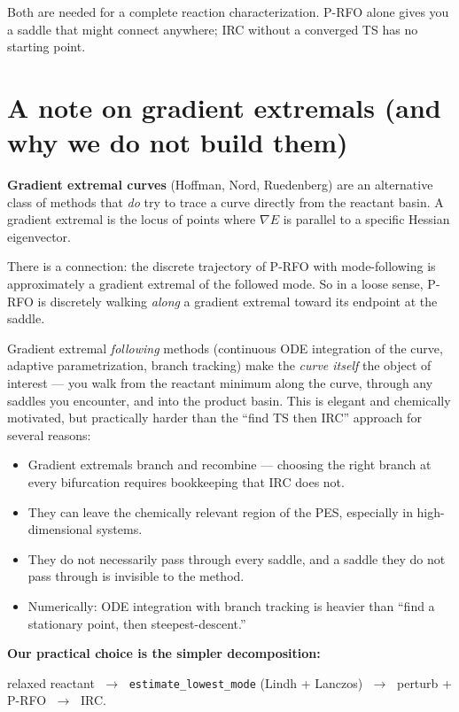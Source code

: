 \documentclass[11pt]{article}
\begin{document}
Both are needed for a complete reaction characterization.  P-RFO alone gives
you a saddle that might connect anywhere; IRC without a converged TS has no
starting point.

\section{A note on gradient extremals (and why we do not build them)}

\textbf{Gradient extremal curves} (Hoffman, Nord, Ruedenberg) are an alternative
class of methods that \emph{do} try to trace a curve directly from the reactant
basin.  A gradient extremal is the locus of points where $\nabla E$ is
parallel to a specific Hessian eigenvector.

There is a connection: the discrete trajectory of P-RFO with mode-following is
approximately a gradient extremal of the followed mode.  So in a loose sense,
P-RFO is discretely walking \emph{along} a gradient extremal toward its
endpoint at the saddle.

Gradient extremal \emph{following} methods (continuous ODE integration of the
curve, adaptive parametrization, branch tracking) make the \emph{curve itself}
the object of interest --- you walk from the reactant minimum along the curve,
through any saddles you encounter, and into the product basin.  This is
elegant and chemically motivated, but practically harder than the ``find TS
then IRC'' approach for several reasons:

\begin{itemize}
  \item Gradient extremals branch and recombine --- choosing the right branch
        at every bifurcation requires bookkeeping that IRC does not.
  \item They can leave the chemically relevant region of the PES, especially
        in high-dimensional systems.
  \item They do not necessarily pass through every saddle, and a saddle they
        do not pass through is invisible to the method.
  \item Numerically: ODE integration with branch tracking is heavier than
        ``find a stationary point, then steepest-descent.''
\end{itemize}

\textbf{Our practical choice is the simpler decomposition:}
\begin{center}
relaxed reactant
$\;\to\;$ \texttt{estimate\_lowest\_mode} (Lindh + Lanczos)
$\;\to\;$ perturb + P-RFO
$\;\to\;$ IRC.
\end{center}
\end{document}
